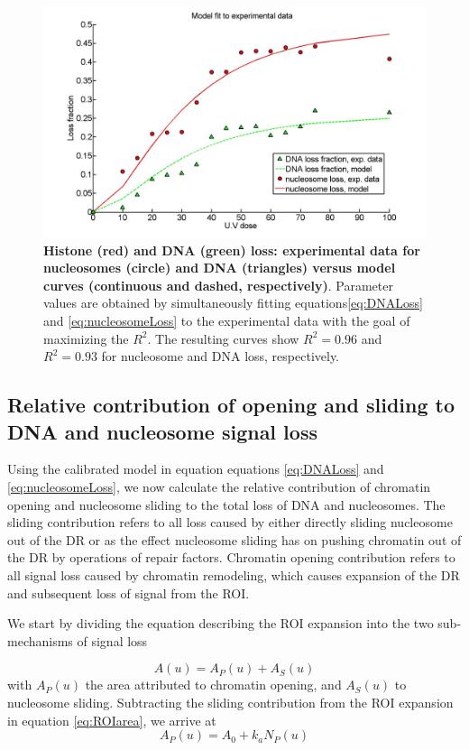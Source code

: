 \documentclass[12pt]{article}
\begin{document}
	
\begin{figure}[H]
\centering
\includegraphics[width=0.5\linewidth, height=0.3\textheight]{histoneAndDnaVsUvDoseModelFit}
\caption{\textbf{Histone (red) and DNA (green) loss: experimental data
	for nucleosomes (circle) and DNA (triangles) versus model curves
	(continuous and dashed, respectively)}. Parameter values are obtained
	by simultaneously fitting equations\eqref{eq:DNALoss}  and \eqref{eq:nucleosomeLoss} to the experimental data with
	the goal of maximizing the $R^2$. The resulting curves show $R^2 = 0.96$ and
	$R^2 = 0.93$ for nucleosome and DNA loss, respectively.}
\label{fig:histoneAndDnaVsUvDoseModelFit}
\end{figure}

\subsection{Relative contribution of opening and sliding to DNA
	and nucleosome signal loss}

Using the calibrated model in equation equations \eqref{eq:DNALoss}  and \eqref{eq:nucleosomeLoss}, we now calculate the
relative contribution of chromatin opening and nucleosome sliding to the
total loss of DNA and nucleosomes. The sliding contribution refers to all loss
caused by either directly sliding nucleosome out of the DR or as the effect
nucleosome sliding has on pushing chromatin out of the DR by operations
of repair factors. Chromatin opening contribution refers to all signal loss
caused by chromatin remodeling, which causes expansion of the DR and
subsequent loss of signal from the ROI.

We start by dividing the equation describing the ROI expansion into the
two sub-mechanisms of signal loss

\begin{equation*}
A(u) = A_P(u) +A_S(u)
\end{equation*}
with $A_P(u)$ the area attributed to chromatin opening, and $A_S(u)$ to nucleosome sliding. Subtracting the sliding contribution from the ROI expansion
in equation \eqref{eq:ROIarea}, we arrive at
\begin{equation*}
A_P(u) = A_0 + k_aN_P(u)
\end{equation*}
\end{document}
